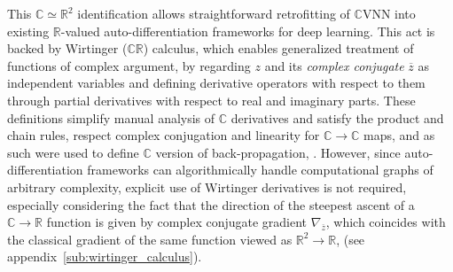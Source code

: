 \documentclass{article}
\newcommand{\real}{\mathbb{R}}
\newcommand{\cplx}{\mathbb{C}}
\newcommand{\conj}[1]{\overline{#1}}
\begin{document}
This $\cplx \simeq \real^2$ identification allows straightforward retrofitting of $\cplx$VNN
into existing $\real$-valued auto-differentiation frameworks for deep learning. This
act is backed by Wirtinger ($\cplx\real$) calculus, which enables generalized treatment
of functions of complex argument, by regarding $z$ and its \emph{complex conjugate}
$\conj{z}$ as independent variables and defining derivative operators with respect to
them through partial derivatives with respect to real and imaginary parts. These definitions
simplify manual analysis of $\cplx$ derivatives and satisfy the product and chain rules, respect
complex conjugation and linearity for $\cplx \to \cplx$ maps, and as such were used to define
$\cplx$ version of back-propagation, \citep{benvenuto_complex_1992,guberman_complex_2016}.
However, since auto-differentiation frameworks can algorithmically handle computational
graphs of arbitrary complexity, explicit use of Wirtinger derivatives is not required,
especially considering the fact that the direction of the steepest ascent of a $
  \cplx \to \real
$ function is given by complex conjugate gradient $\nabla_{\conj{z}}$, which coincides
with the classical gradient of the same function viewed as $\real^2 \to \real$,
(see appendix~\ref{sub:wirtinger_calculus}).
%
%
%
\end{document}
